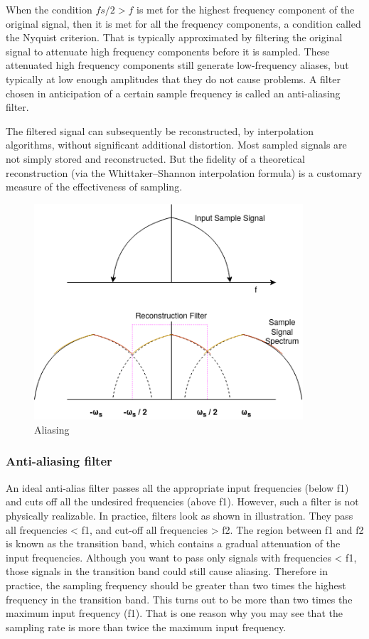 \documentclass{article}
\begin{document}
When the condition $  fs/2 > f $  is met for the highest frequency component of the original signal, then it is met for all the frequency components, a condition called the Nyquist criterion. That is typically approximated by filtering the original signal to attenuate high frequency components before it is sampled. These attenuated high frequency components still generate low-frequency aliases, but typically at low enough amplitudes that they do not cause problems. A filter chosen in anticipation of a certain sample frequency is called an anti-aliasing filter.

The filtered signal can subsequently be reconstructed, by interpolation algorithms, without significant additional distortion. Most sampled signals are not simply stored and reconstructed. But the fidelity of a theoretical reconstruction (via the Whittaker–Shannon interpolation formula) is a customary measure of the effectiveness of sampling. 


\begin{figure}[htbp]
    \begin{center}
	\includegraphics[width=100mm]{figures/Untitled Diagram.png}
    \end{center}
    \caption{Aliasing}
\end{figure}

\subsubsection{Anti-aliasing filter}

An \cite{b9} ideal anti-alias filter passes all the appropriate input frequencies (below f1) and cuts off all the undesired frequencies (above f1). However, such a filter is not physically realizable. In practice, filters look as shown in illustration. They pass all frequencies < f1, and cut-off all frequencies > f2. The region between f1 and f2 is known as the transition band, which contains a gradual attenuation of the input frequencies. \cite{b10} Although you want to pass only signals with frequencies < f1, those signals in the transition band could still cause aliasing. Therefore in practice, the sampling frequency should be greater than two times the highest frequency in the transition band. This turns out to be more than two times the maximum input frequency (f1). That is one reason why you may see that the sampling rate is more than twice the maximum input frequency.
\end{document}
